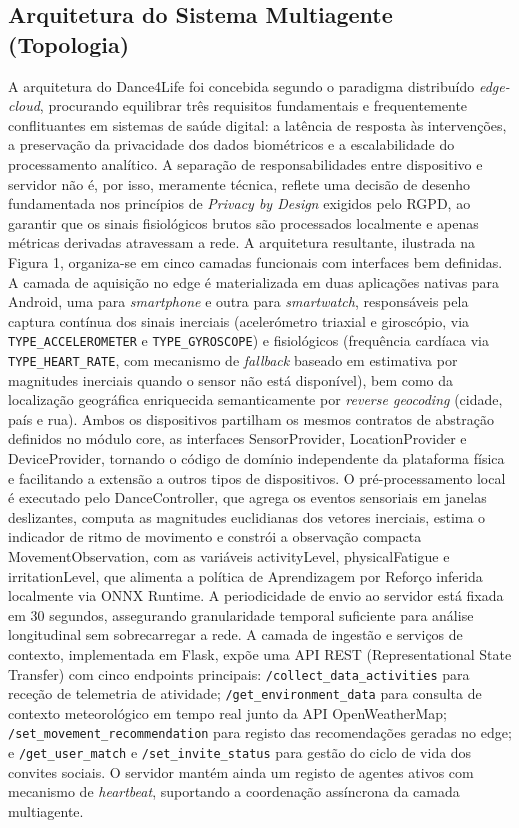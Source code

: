 \documentclass[runningheads]{llncs}
\begin{document}
\subsection{Arquitetura do Sistema Multiagente (Topologia)}
A arquitetura do Dance4Life foi concebida segundo o paradigma distribuído \textit{edge-cloud}, procurando equilibrar três requisitos fundamentais e frequentemente conflituantes em sistemas de saúde digital: a latência de resposta às intervenções, a preservação da privacidade dos dados biométricos e a escalabilidade do processamento analítico. A separação de responsabilidades entre dispositivo e servidor não é, por isso, meramente técnica, reflete uma decisão de desenho fundamentada nos princípios de \textit{Privacy by Design} exigidos pelo RGPD, ao garantir que os sinais fisiológicos brutos são processados localmente e apenas métricas derivadas atravessam a rede. A arquitetura resultante, ilustrada na Figura 1, organiza-se em cinco camadas funcionais com interfaces bem definidas. 
A camada de aquisição no edge é materializada em duas aplicações nativas para Android, uma para \textit{smartphone} e outra para \textit{smartwatch}, responsáveis pela captura contínua dos sinais inerciais (acelerómetro triaxial e giroscópio, via \texttt{TYPE\_ACCELEROMETER} e \texttt{TYPE\_GYROSCOPE}) e fisiológicos (frequência cardíaca via \texttt{TYPE\_HEART\_RATE}, com mecanismo de \textit{fallback} baseado em estimativa por magnitudes inerciais quando o sensor não está disponível), bem como da localização geográfica enriquecida semanticamente por \textit{reverse geocoding} (cidade, país e rua). Ambos os dispositivos partilham os mesmos contratos de abstração definidos no módulo core, as interfaces SensorProvider, LocationProvider e DeviceProvider, tornando o código de domínio independente da plataforma física e facilitando a extensão a outros tipos de dispositivos. 
O pré-processamento local é executado pelo DanceController, que agrega os eventos sensoriais em janelas deslizantes, computa as magnitudes euclidianas dos vetores inerciais, estima o indicador de ritmo de movimento e constrói a observação compacta MovementObservation, com as variáveis activityLevel, physicalFatigue e irritationLevel, que alimenta a política de Aprendizagem por Reforço inferida localmente via ONNX Runtime. A periodicidade de envio ao servidor está fixada em 30 segundos, assegurando granularidade temporal suficiente para análise longitudinal sem sobrecarregar a rede. 
A camada de ingestão e serviços de contexto, implementada em Flask, expõe uma API REST (Representational State Transfer) com cinco endpoints principais: \texttt{/collect\_data\_activities} para receção de telemetria de atividade; \texttt{/get\_environment\_data} para consulta de contexto meteorológico em tempo real junto da API OpenWeatherMap; \texttt{/set\_movement\_recommendation} para registo das recomendações geradas no edge; e \texttt{/get\_user\_match} e \texttt{/set\_invite\_status} para gestão do ciclo de vida dos convites sociais. O servidor mantém ainda um registo de agentes ativos com mecanismo de \textit{heartbeat}, suportando a coordenação assíncrona da camada multiagente. 
\end{document}

